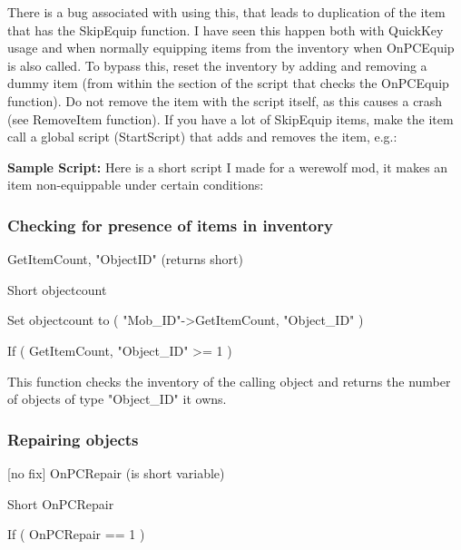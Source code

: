 \documentclass[
]{article}
\begin{document}
There is a bug associated with using this, that leads to duplication of
the item that has the SkipEquip function. I have seen this happen both
with QuickKey usage and when normally equipping items from the inventory
when OnPCEquip is also called. To bypass this, reset the inventory by
adding and removing a dummy item (from within the section of the script
that checks the OnPCEquip function). Do not remove the item with the
script itself, as this causes a crash (see RemoveItem function). If you
have a lot of SkipEquip items, make the item call a global script
(StartScript) that adds and removes the item, e.g.:



\textbf{Sample Script:} Here is a short script I made for a werewolf
mod, it makes an item non-equippable under certain conditions:



\hypertarget{checking-for-presence-of-items-in-inventory}{%
\subsubsection{Checking for presence of items in
inventory}\label{checking-for-presence-of-items-in-inventory}}

GetItemCount, "ObjectID" (returns short)

Short objectcount

Set objectcount to ( "Mob\_ID"-\textgreater GetItemCount, "Object\_ID" )

If ( GetItemCount, "Object\_ID" \textgreater= 1 )

This function checks the inventory of the calling object and returns the
number of objects of type "Object\_ID" it owns.

\hypertarget{section-1}{%
\subsubsection{}\label{section-1}}

\hypertarget{repairing-objects}{%
\subsubsection{Repairing objects}\label{repairing-objects}}

{[}no fix{]} OnPCRepair (is short variable)

Short OnPCRepair

If ( OnPCRepair == 1 )
\end{document}
